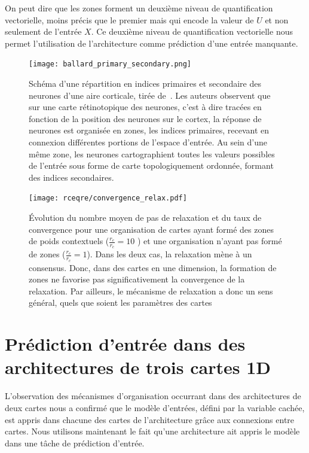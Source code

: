 \documentclass[../main]{subfiles}
\begin{document}
On peut dire que les zones forment un deuxième niveau de quantification vectorielle, moins précis que le premier mais qui encode la valeur de $U$ et non seulement de l'entrée $X$.
Ce deuxième niveau de quantification vectorielle nous permet l'utilisation de l'architecture comme prédiction d'une entrée manquante.

\begin{figure}
	\centering\texttt{[image: ballard\_primary\_secondary.png]}
	\caption{Schéma d'une répartition en indices primaires et secondaire des neurones d'une aire corticale, tirée de~\cite{ballard_cortical_1986}. Les auteurs observent que sur une carte rétinotopique des neurones, c'est à dire tracées en fonction de la position des neurones sur le cortex, la réponse de neurones est organisée en zones, les indices primaires, recevant en connexion différentes portions de l'espace d'entrée. Au sein d'une même zone, les neurones cartographient toutes les valeurs possibles de l'entrée sous forme de carte topologiquement ordonnée, formant des indices secondaires. \label{fig:ballard}}
\end{figure}

\begin{figure}
	\texttt{[image: rceqre/convergence\_relax.pdf]}
	\caption{\'Evolution du nombre moyen de pas de relaxation et du taux de convergence pour une organisation de cartes ayant formé des zones de poids contextuels ($\frac{r_e}{r_c} = 10$ ) et une organisation n'ayant pas formé de zones ($\frac{r_e}{r_c} = 1$). Dans les deux cas, la relaxation mène à un consensus. 
	Donc, dans des cartes en une dimension, la formation de zones ne favorise pas significativement la convergence de la relaxation. Par ailleurs, le mécanisme de relaxation a donc un sens général, quels que soient les paramètres des cartes \label{fig:conv_rcre}}
\end{figure}


\section{Prédiction d'entrée dans des architectures de trois cartes 1D}

L'observation des mécanismes d'organisation occurrant dans des architectures de deux cartes nous a confirmé que le modèle d'entrées, défini par la variable cachée, est appris dans chacune des cartes de l'architecture grâce aux connexions entre cartes.
Nous utilisons maintenant le fait qu'une architecture ait appris le modèle dans une tâche de prédiction d'entrée.
\end{document}
